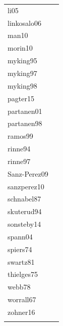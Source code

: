 \documentclass{article}
\begin{document}
\begin{footnotesize}
\begin{longtable}{p{}p{}}
  li05 & \citet{Li:2005aa} \\ 
  linkosalo06 & \citet{Linkosalo:2006aa} \\ 
  man10 & \citet{Man:2010aa} \\ 
  morin10 & \citet{Morin:2010aa} \\ 
  myking95 & \citet{Myking:1995} \\ 
  myking97 & \citet{Myking:1997aa} \\ 
  myking98 & \citet{Myking:1998aa} \\ 
  pagter15 & \citet{Pagter:2015} \\ 
  partanen01 & \citet{Partanen:2001aa} \\ 
  partanen98 & \citet{Partanen:1998aa} \\ 
  ramos99 & \citet{ramos:1999} \\ 
  rinne94 & \citet{Rinne:1994} \\ 
  rinne97 & \citet{Rinne:1997aa} \\ 
  Sanz-Perez09 & \citet{Sanz-Perez:2009aa} \\ 
  sanzperez10 & \citet{Sanz-Perez:2010aa} \\ 
  schnabel87 & \citet{Schnabel:1987aa} \\ 
  skuterud94 & \citet{Skuterud:1994aa} \\ 
  sonsteby14 & \citet{Sonsteby:2014aa} \\ 
  spann04 & \citet{Spann:2004aa} \\ 
  spiers74 & \citet{Spiers:1974aa} \\ 
  swartz81 & \citet{Swartz:1981aa} \\ 
  thielges75 & \citet{Thielges:1976aa} \\ 
  webb78 & \citet{Webb:1977} \\ 
  worrall67 & \citet{Worrall:1967aa} \\ 
  zohner16 & \citet{zohner2016} \\ 
  \hline
\label{tab:ref}
\end{longtable}
\endgroup


\end{footnotesize}
\end{document}
